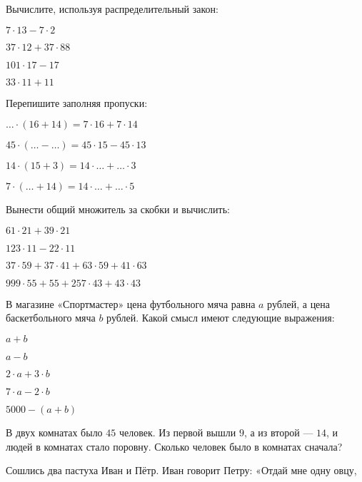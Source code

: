 \begin{listofex}
	\item Вычислите, используя распределительный закон:
	\begin{enumcols}[itemcolumns=2]
		\item \( 7\cdot13-7\cdot2 \)
		\item \( 37\cdot12+37\cdot88 \)
		\item \( 101\cdot17-17 \)
		\item \( 33\cdot11+11 \)
	\end{enumcols}
	\item Перепишите заполняя пропуски:
	\begin{enumcols}[itemcolumns=2]
		\item \( {\dots}\cdot(16+14)=7\cdot16+7\cdot14 \)
		\item \( 45\cdot({\dots}-{\dots})=45\cdot15-45\cdot13 \)
		\item \( 14\cdot(15+3)=14\cdot{\dots}+{\dots}\cdot3 \)
		\item \( 7\cdot({\dots}+14)=14\cdot{\dots}+{\dots}\cdot5 \)
	\end{enumcols}
	\item Вынести общий множитель за скобки и вычислить:
	\begin{enumcols}[itemcolumns=2]
		\item \( 61\cdot21+39\cdot21 \)
		\item \( 123\cdot11-22\cdot11 \)
		\item \( 37\cdot59+37\cdot41+63\cdot59+41\cdot63 \)
		\item \( 999\cdot55+55+257\cdot43+43\cdot43 \)
	\end{enumcols}
	\item В магазине «Спортмастер» цена футбольного мяча равна \( a \) рублей, а цена баскетбольного
	мяча \( b \) рублей. Какой смысл имеют следующие выражения:
	\begin{enumcols}[itemcolumns=5]
		\item \( a+b \)
		\item \( a-b \)
		\item \( 2\cdot a + 3\cdot b \)
		\item \( 7\cdot a - 2\cdot b \)
		\item \( 5000 - (a+b) \)
	\end{enumcols}
	\item В двух комнатах было \( 45 \) человек. Из первой вышли \( 9 \), а из второй --- \( 14 \), и людей в комнатах стало поровну. Сколько человек было в комнатах сначала?
	\item Сошлись два пастуха Иван и Пётр. Иван говорит Петру: «Отдай мне одну овцу,

\end{listofex}
